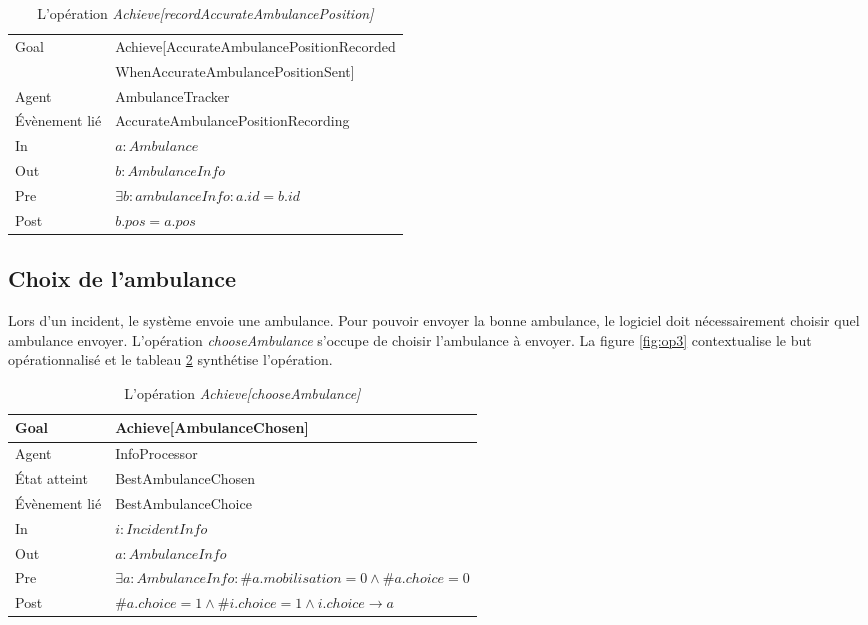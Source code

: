 	\begin{table}[!h] \centering
		\begin{tabularx}{\textwidth}{|l|X|} \hline
			Goal & Achieve[AccurateAmbulancePositionRecorded\\ &WhenAccurateAmbulancePositionSent] \\ \hline
			Agent & AmbulanceTracker \\ \hline
			Évènement lié & AccurateAmbulancePositionRecording \\ \hline
			In & $a: Ambulance$ \\ \hline
			Out & $b: AmbulanceInfo$ \\ \hline
			Pre & $\exists b: ambulanceInfo : a.id = b.id$ \\ \hline
			Post & $b.pos = a.pos$ \\ \hline
		\end{tabularx}
		\caption{L'opération \textit{Achieve[recordAccurateAmbulancePosition]}}\label{tab:op2}
	\end{table}
	
\newpage
\subsection{Choix de l'ambulance}
	
	Lors d'un incident, le système envoie une ambulance. Pour pouvoir envoyer
	la bonne ambulance, le logiciel doit nécessairement choisir quel
	ambulance envoyer. L'opération \textit{chooseAmbulance} s'occupe de choisir
	l'ambulance à envoyer. La figure \ref{fig:op3} contextualise le but
	opérationnalisé et le tableau \ref{tab:op3} synthétise l'opération.
	
	\vfill
	\vfill
	
	\begin{table}[!h] \centering
		\begin{tabularx}{\textwidth}{|l|X|} \hline
			Goal & Achieve[AmbulanceChosen] \\ \hline
			Agent & InfoProcessor \\ \hline
			État atteint & BestAmbulanceChosen \\ \hline
			Évènement lié & BestAmbulanceChoice \\ \hline
			In & $i: IncidentInfo$ \\ \hline
			Out & $a: AmbulanceInfo$ \\ \hline
			Pre & $\exists a: AmbulanceInfo : \#a.mobilisation = 0 \wedge \#a.choice = 0$ \\ \hline
			Post & $\#a.choice = 1 \wedge \#i.choice = 1 \wedge i.choice \rightarrow a$ \\ \hline
		\end{tabularx}
		\caption{L'opération \textit{Achieve[chooseAmbulance]}}\label{tab:op3}
	\end{table}
	

